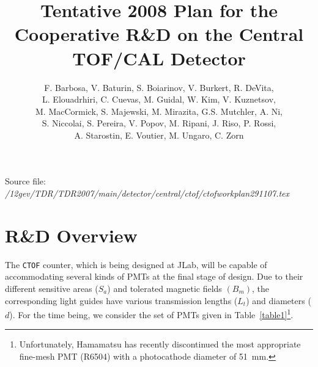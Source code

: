 \documentclass[12pt]{article}
\begin{document}
%
\title{Tentative 2008 Plan for the Cooperative R\&D on the Central TOF/CAL 
Detector}

\author{F. Barbosa, V. Baturin, S. Boiarinov, V. Burkert, R. DeVita, \\
L. Elouadrhiri, C. Cuevas, M. Guidal, W. Kim, V. Kuznetsov, \\
M. MacCormick, S. Majewski, M. Mirazita, G.S. Mutchler, A. Ni, \\
S. Niccolai, S. Pereira, V. Popov, M. Ripani, J. Riso, P. Rossi, \\
A. Starostin, E. Voutier, M. Ungaro, C. Zorn}

\maketitle  

\noindent
Source file: {\small {\it /12gev/TDR/TDR2007/main/detector/central/ctof/ctofworkplan291107.tex}}

\nopagebreak

\tableofcontents
\listoftables

\newpage

\section{R\&D Overview} 

The {\tt CTOF} counter, which is being designed at JLab, will be capable
of accommodating several kinds of PMTs at the final stage of design.  Due 
to their different sensitive areas ($S_a$) and tolerated magnetic fields 
$(B_m)$, the corresponding light guides have various transmission lengths
($L_t$) and diameters ($d$).  For the time being, we consider the set of
PMTs given in Table~\ref{table1}\footnote{Unfortunately, Hamamatsu has 
recently discontinued the most appropriate fine-mesh PMT (R6504) with a 
photocathode diameter of 51~mm.}.
\end{document}
